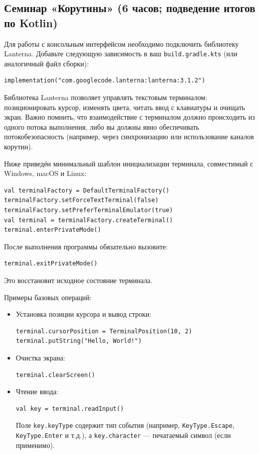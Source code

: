 \subsection{Семинар «Корутины» (6 часов; подведение итогов по Kotlin)}

Для работы с консольным интерфейсом необходимо подключить библиотеку Lanterna. Добавьте следующую зависимость в ваш \texttt{build.gradle.kts} (или аналогичный файл сборки):

\begin{verbatim}
implementation("com.googlecode.lanterna:lanterna:3.1.2")
\end{verbatim}

Библиотека Lanterna позволяет управлять текстовым терминалом: позиционировать курсор, изменять цвета, читать ввод с клавиатуры и очищать экран. Важно помнить, что взаимодействие с терминалом должно происходить из одного потока выполнения, либо вы должны явно обеспечивать потокобезопасность (например, через синхронизацию или использование каналов корутин).

Ниже приведён минимальный шаблон инициализации терминала, совместимый с Windows, macOS и Linux:

\begin{verbatim}
val terminalFactory = DefaultTerminalFactory()
terminalFactory.setForceTextTerminal(false)
terminalFactory.setPreferTerminalEmulator(true)
val terminal = terminalFactory.createTerminal()
terminal.enterPrivateMode()
\end{verbatim}

После выполнения программы обязательно вызовите:

\begin{verbatim}
terminal.exitPrivateMode()
\end{verbatim}

Это восстановит исходное состояние терминала.

Примеры базовых операций:

\begin{itemize}
  \item Установка позиции курсора и вывод строки:
  \begin{verbatim}
terminal.cursorPosition = TerminalPosition(10, 2)
terminal.putString("Hello, World!")
  \end{verbatim}
  
  \item Очистка экрана:
  \begin{verbatim}
terminal.clearScreen()
  \end{verbatim}
  
  \item Чтение ввода:
  \begin{verbatim}
val key = terminal.readInput()
  \end{verbatim}
  
  Поле \verb|key.keyType| содержит тип события (например, \verb|KeyType.Escape|, \verb|KeyType.Enter| и т.д.), а \verb|key.character| — печатаемый символ (если применимо).
\end{itemize}

